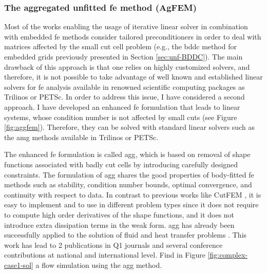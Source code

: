 \documentclass{article}
\newcommand{\bemph}[1]{#1}
\begin{document}
\subsubsection{The aggregated unfitted \ac{fe} method (AgFEM)}

Most of the works enabling the usage of iterative linear solver in combination with embedded \ac{fe} methods consider tailored preconditioners in order to deal with matrices affected by the small cut cell problem (e.g., the \ac{bddc} method for embedded grids previously presented in Section \ref{sec:unf-BDDC}). The main drawback of this approach is that one relies on highly customized solvers, and therefore, it is not possible to take advantage of well known and established linear solvers for \ac{fe} analysis available in renowned scientific computing packages as Trilinos or PETSc. In order to address this issue, I have considered a second approach. \bemph{I have developed an enhanced \ac{fe} formulation that leads to linear systems, whose condition number is not affected by small cuts} (see Figure \ref{fig:aggfem}). Therefore, they can be solved with standard linear solvers such as the \ac{amg} methods available in Trilinos or PETSc.

The enhanced \ac{fe} formulation is called \ac{agg}, which is based on removal of shape functions associated with badly cut cells by introducing carefully designed constraints.  The formulation of \ac{agg} shares the good properties of body-fitted \ac{fe} methods such as stability, condition number bounds, optimal convergence, and continuity with respect to data.  In contrast to previous works like CutFEM \cite{burman_2015}, it is easy to implement and to use in different problem types since it does not require to compute high order derivatives of the shape functions, and it does not introduce extra dissipation terms in the weak form.  \ac{agg} has already been successfully applied to the solution of fluid \cite{badia_2018b} and heat transfer problems \cite{badia_2018a}. This work has lead to {{2 publications in Q1 journals}} and several conference contributions at national and international level. Find in Figure \ref{fig:complex-case1-sol} a flow simulation using the \ac{agg} method.
\end{document}
